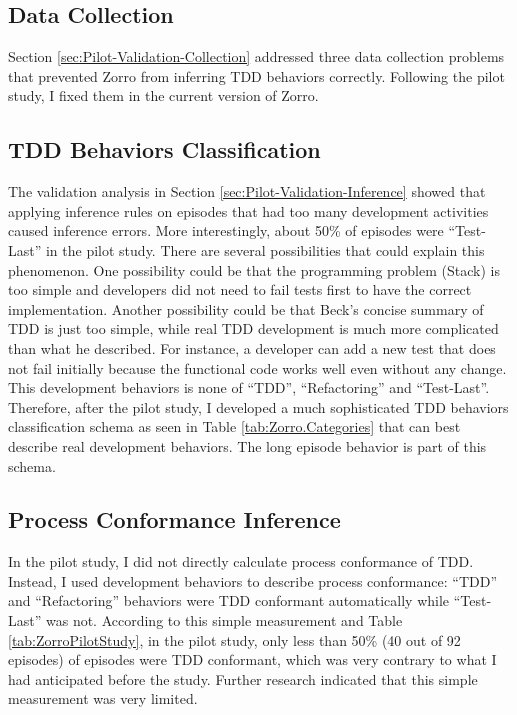 \subsection{Data Collection}
Section \ref{sec:Pilot-Validation-Collection} addressed three data collection problems that prevented Zorro from inferring TDD behaviors correctly. Following the pilot study, I fixed them in the current version of Zorro.

\subsection{TDD Behaviors Classification}
The validation analysis in Section \ref{sec:Pilot-Validation-Inference} showed that applying inference rules on episodes that had too many development activities caused inference errors. More interestingly, about 50\% of episodes were ``Test-Last'' in the pilot study. There are several possibilities that could explain this phenomenon. One possibility could be that the programming problem (Stack) is too simple and developers did not need to fail tests first to have the correct implementation. Another possibility could be that Beck's concise summary of TDD is just too simple, while real TDD development is much more complicated than what he described. For instance, a developer can add a new test that does not fail initially because the functional code works well even without any change. This development behaviors is none of ``TDD'', ``Refactoring'' and ``Test-Last''. Therefore, after the pilot study, I developed a much sophisticated TDD behaviors classification schema as seen in Table \ref{tab:Zorro.Categories} that can best describe real development behaviors. The long episode behavior is part of this schema. 

\subsection{Process Conformance Inference}
In the pilot study, I did not directly calculate process conformance of TDD. Instead, I used development behaviors to describe process conformance: ``TDD'' and ``Refactoring'' behaviors were TDD conformant automatically while ``Test-Last'' was not. According to this simple measurement and Table \ref{tab:ZorroPilotStudy}, in the pilot study, only less than 50\% (40 out of 92 episodes) of episodes were TDD conformant, which was very contrary to what I had anticipated before the study. Further research indicated that this simple measurement was very limited. 

